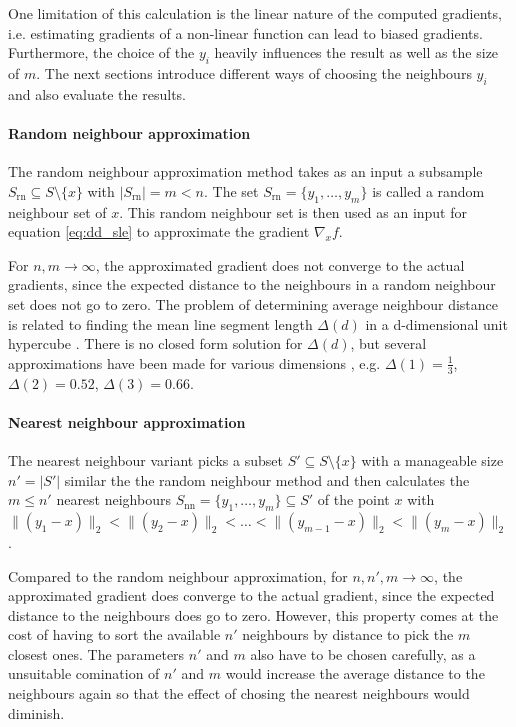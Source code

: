 \documentclass[
  a4paper,  %
  twoside,  %
  bibliography=totoc,
  headsepline,
  cleardoublepage=empty,
  parskip=half,
  draft=false
]{scrbook}
\begin{document}
One limitation of this calculation is the linear nature of the computed gradients, i.e. estimating gradients of a non-linear function can lead to biased gradients.
Furthermore, the choice of the $y_i$ heavily influences the result as well as the size of $m$.
The next sections introduce different ways of choosing the neighbours $y_i$ and also evaluate the results.


\paragraph{Random neighbour approximation}
The random neighbour approximation method takes as an input a subsample $S_{\text{rn}} \subseteq S \setminus \{x\}$ with $|S_{\text{rn}}|=m < n$.
The set $S_{\text{rn}}=\{y_1, \dots, y_{m}\}$ is called a random neighbour set of $x$.
This random neighbour set is then used as an input for equation \cref{eq:dd_sle} to approximate the gradient $\nabla_x f$.

For $n,m \to \infty$, the approximated gradient does not converge to the actual gradients, since the expected distance to the neighbours in a random neighbour set does not go to zero.
The problem of determining average neighbour distance is related to finding the mean line segment length $\Delta (d)$ in a d-dimensional unit hypercube \cite{Bailey2007}.
There is no closed form solution for $\Delta (d)$, but several approximations have been made for various dimensions \cite{Weisstein}, e.g. $\Delta (1)=\frac{1}{3}$, $\Delta (2)=0.52$, $\Delta (3)=0.66$.

\paragraph{Nearest neighbour approximation}
The nearest neighbour variant picks a subset $S' \subseteq S \setminus \{x\}$ with a manageable size $n'=|S'|$ similar the the random neighbour method and then calculates the $m \leq n'$ nearest neighbours $S_{\text{nn}}=\{y_1,\dots,y_m\} \subseteq S'$ of the point $x$ with $\|(y_1-x)\|_2 < \|(y_2-x)\|_2< \dots<\|(y_{m-1}-x)\|_2 < \|(y_{m}-x)\|_2$.

Compared to the random neighbour approximation, for $n,n',m \to \infty$, the approximated gradient does converge to the actual gradient, since the expected distance to the neighbours does go to zero.
However, this property comes at the cost of having to sort the available $n'$ neighbours by distance to pick the $m$ closest ones.
The parameters $n'$ and $m$ also have to be chosen carefully, as a unsuitable comination of $n'$ and $m$ would increase the average distance to the neighbours again so that the effect of chosing the nearest neighbours would diminish.
\end{document}
